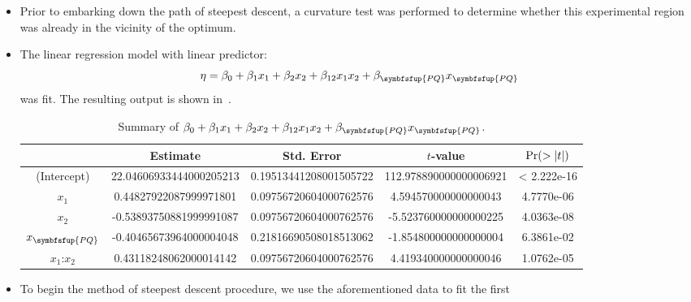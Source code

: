 \begin{itemize}
\begin{table}[!htbp]
\begin{tabular}
                  \bottomrule
              \end{tabular}
          \end{table}
    \item Prior to embarking down the path of steepest descent, a curvature test was performed to determine
          whether this experimental region was already in the vicinity of the optimum.
    \item The linear regression model with linear predictor:
          \[ \eta=\beta_0+\beta_1x_1+\beta_2x_2+\beta_{12}x_1x_2+\beta_{\symbfsfup{PQ}}x_{\symbfsfup{PQ}} \]
          was fit. The resulting output is shown in~.
          \begin{table}[!htbp]
              \centering
              \caption{Summary of $ \beta_0+\beta_1x_1+\beta_2x_2+\beta_{12}x_1x_2+\beta_{\symbfsfup{PQ}}x_{\symbfsfup{PQ}} $.}\label{tab:netflixOUT1}
              \begin{tabular}{c
                      S[table-format=-2.3]
                      S[table-format=1.3]
                      S[table-format=-3.3]
                      S[table-format=<1.3e-2]}
                  \toprule
                                         & {Estimate}              & {Std. Error}           & {$ t $-value}          & {$ \Pr({>\lvert t\rvert}) $} \\
                  \midrule
                  (Intercept)            & 22.04606933444000205213 & 0.19513441208001505722 & 112.978890000000006921 & < 2.222e-16           \\
                  $ x_1 $                & 0.44827922087999971801  & 0.09756720604000762576 & 4.594570000000000043   & 4.7770e-06            \\
                  $ x_2 $                & -0.53893750881999991087 & 0.09756720604000762576 & -5.523760000000000225  & 4.0363e-08            \\
                  $ x_{\symbfsfup{PQ}} $ & -0.40465673964000004048 & 0.21816690508018513062 & -1.854800000000000004  & 6.3861e-02            \\
                  $ x_1\text{:}x_2 $     & 0.43118248062000014142  & 0.09756720604000762576 & 4.419340000000000046   & 1.0762e-05            \\
                  \bottomrule
              \end{tabular}
          \end{table}
    \item To begin the method of steepest descent procedure, we use the aforementioned data to fit the first

\end{itemize}
